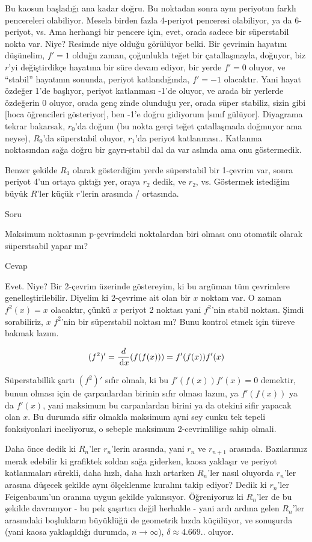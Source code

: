 \documentclass[12pt,fleqn]{article}\usepackage{../../common}
\begin{document}
Bu kaosun başladığı ana kadar doğru. Bu noktadan sonra aynı periyotun farklı
pencereleri olabiliyor. Mesela birden fazla 4-periyot penceresi olabiliyor, ya
da 6-periyot, vs. Ama herhangi bir pencere için, evet, orada sadece bir
süperstabil nokta var. Niye? Resimde niye olduğu görülüyor belki. Bir çevrimin
hayatını düşünelim, $f'=1$ olduğu zaman, çoğunlukla teğet bir çatallaşmayla,
doğuyor, biz $r$'yi değiştirdikçe hayatına bir süre devam ediyor, bir yerde
$f'=0$ oluyor, ve ``stabil'' hayatının sonunda, periyot katlandığında, $f'=-1$
olacaktır. Yani hayat özdeğer 1'de başlıyor, periyot katlanması -1'de oluyor, ve
arada bir yerlerde özdeğerin 0 oluyor, orada genç zinde olunduğu yer, orada
süper stabiliz, sizin gibi [hoca öğrencileri gösteriyor], ben -1'e doğru
gidiyorum [sınıf gülüyor]. Diyagrama tekrar bakarsak, $r_0$'da doğum (bu nokta
gerçi teğet çatallaşmada doğmuyor ama neyse), $R_0$'da süperstabil oluyor,
$r_1$'da periyot katlanması.. Katlanma noktasından sağa doğru bir gayrı-stabil
dal da var aslında ama onu göstermedik.

Benzer şekilde $R_1$ olarak gösterdiğim yerde süperstabil bir 1-çevrim var,
sonra periyot 4'un ortaya çıktığı yer, oraya $r_2$ dedik, ve $r_2$,
vs. Göstermek istediğim büyük $R$'ler küçük $r$'lerin arasında / ortasında. 

Soru

Maksimum noktasının p-çevrimdeki noktalardan biri olması onu otomatik olarak
süperstsabil yapar mı?

Cevap

Evet. Niye? Bir 2-çevrim üzerinde göstereyim, ki bu argüman tüm çevrimlere
genelleştirilebilir. Diyelim ki 2-çevrime ait olan bir $x$ noktam var. O zaman
$f^2(x) = x$ olacaktır, çünkü $x$ periyot 2 noktası yani $f^2$'nin stabil
noktası. Şimdi sorabiliriz, $x$ $f^2$'nin bir süperstabil noktası mı? Bunu
kontrol etmek için türeve bakmak lazım.

$$ (f^2)' = \frac{d}{\,\mathrm{d} x} (f(f(x))) = f'(f(x))f'(x)  $$

Süperstabillik şartı $(f^2)'$ sıfır olmalı, ki bu $f'(f(x))f'(x)=0$ demektir,
bunun olması için de çarpanlardan birinin sıfır olması lazım, ya $f'(f(x))$ ya
da $f'(x)$, yani maksimum bu carpanlardan birini ya da otekini sifir yapacak
olan $x$. Bu durumda sifir olmakla maksimum ayni sey cunku tek tepeli
fonksiyonlari inceliyoruz, o sebeple maksimum 2-cevrimlilige sahip olmali.

Daha önce dedik ki $R_n$'ler $r_n$'lerin arasında, yani $r_n$ ve $r_{n+1}$
arasında. Bazılarımız merak edebilir ki grafiktek soldan sağa giderken, kaosa
yaklaşır ve periyot katlanmaları sürekli, daha hızlı, daha hızlı artarken
$R_n$'ler nasıl oluyorda $r_n$'ler arasına düşecek şekilde aynı ölçeklenme
kuralını takip ediyor? Dedik ki $r_n$'ler Feigenbaum'un oranına uygun şekilde
yakınsıyor. Öğreniyoruz ki $R_n$'ler de bu şekilde davranıyor - bu pek şaşırtıcı
değil herhalde - yani ardı ardına gelen $R_n$'ler arasındaki boşlukların
büyüklüğü de geometrik hızda küçülüyor, ve sonuşurda (yani kaosa yaklaşıldığı
durumda, $n \to \infty$), $\delta \approx 4.669..$ oluyor. 
\end{document}
